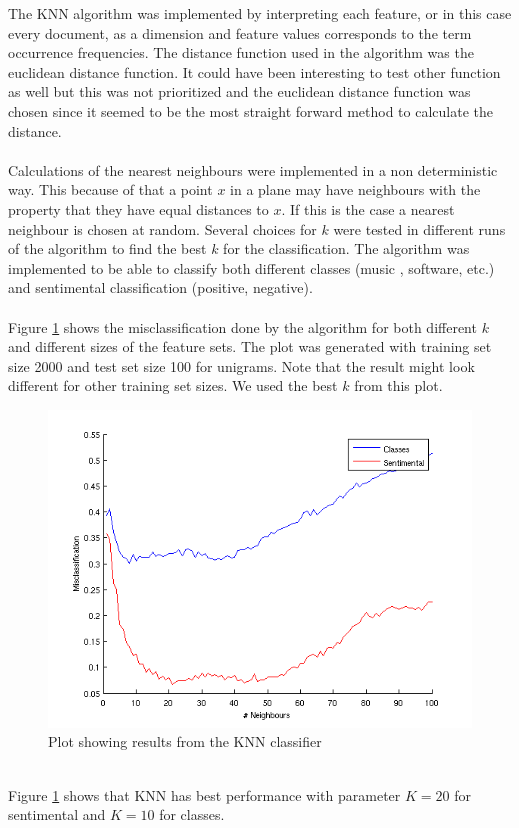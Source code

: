The KNN algorithm was implemented by interpreting each feature, or in this case
every document, as a dimension and feature values corresponds to the term
occurrence frequencies. The distance function used in the algorithm was the
euclidean distance function. It could have been interesting to test other
function as well but this was not prioritized and the euclidean distance function
was chosen since it seemed to be the most straight forward method to calculate
the distance. 
\\\\
Calculations of the nearest neighbours were implemented in a non deterministic way. This
because of that a point $x$ in a plane may have neighbours with the property
that they have equal distances to $x$. If this is the case a nearest neighbour
is chosen at random. Several choices for $k$ were tested in different runs of
the algorithm to find the best $k$ for the classification. The algorithm was
implemented to be able to classify both different classes (music , software,
etc.) and sentimental classification (positive, negative). \\\\
Figure \ref{fig:KNNplot} shows the misclassification done by the algorithm for both
different $k$ and different sizes of the feature sets. The plot was generated
with training set size 2000 and test set size 100 for unigrams. Note that the
result might look different for other training set sizes. We used the best $k$
from this plot.\\
\begin{figure}[h!]
\centering
\includegraphics[scale=0.6]{../Plottar/knn_2000words_testdata100_unigram}
\caption{Plot showing results from the KNN classifier}
\label{fig:KNNplot}
\end{figure}\\
Figure \ref{fig:KNNplot} shows that KNN has best performance with parameter $K = 20$ for sentimental and $K = 10$ for classes.

